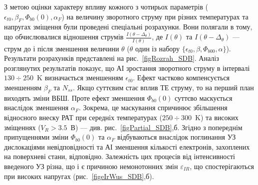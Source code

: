 З метою оцінки характеру впливу  кожного з чотирьох параметрів ($\epsilon_{t0}, \beta_F, \Phi_{b0}(0), \alpha_F$) на величину зворотного струму при
різних температурах та напругах зміщення були проведені спеціальні розрахунки.
Вони полягали в тому, що обчислювалися відношення струмів
$\frac{I(\theta-\Delta_\theta)}{I(\theta)}$,
де $I(\theta)$ та $I(\theta-\Delta_\theta)$ --- струм до і після зменшення величини $\theta$ ($\theta$ один із набору $\{\epsilon_{t0}, \beta, \Phi_{b00}, \alpha\}$).
Результати розрахунків представлені на рис.~\ref{figRozrah_SDB}.
Аналіз розглянутих результатів показує, що АІ зростання зворотного струму в інтервалі $130\div250$~K визначається зменшенням $\epsilon_{t0}$.
Ефект частково компенсується зменшенням $\beta_F$ та $N_{ss}$.
Якщо суттєвим стає вплив ТЕ струму, то на перший план виходять зміни ВБШ.
Проте ефект зменшення $\Phi_{b0}(0)$ суттєво маскується внаслідок зменшення $\alpha_F$.
Зокрема, це маскування спричинює збільшення відносного внеску РАТ при середніх температурах ($250\div300$~K) та високих зміщеннях ($V_R>3.5$~В) --- див. рис.~\ref{figPartial_SDB},б.
Згідно з попереднім  припущеннями зміни $\Phi_{b0}(0)$ та $\alpha_F$ відбуваються внаслідок поглинання УЗ дислокаціями
невідповідності та АІ зменшення кількості електронів, захоплених на поверхневі стани, відповідно.
Залежність цих процесів від інтенсивності введеного УЗ різна,
що і є причиною немонотонних змін $\varepsilon_{IR}$, що спостерігаються при високих напругах (рис.~\ref{figeIrWus_SDB},б).



